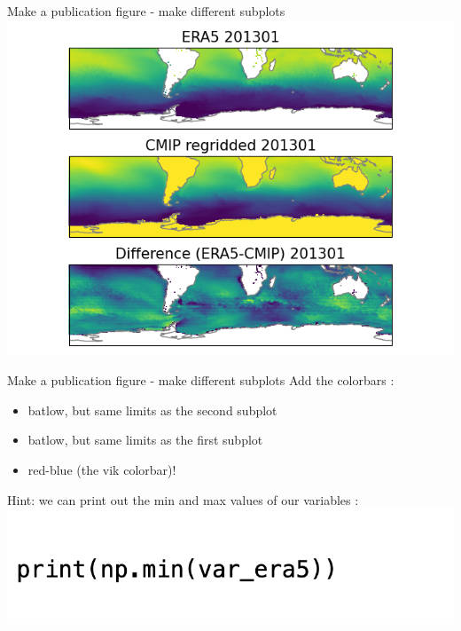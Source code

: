 \begin{frame}{\insertsectionnumber{ |} Make a publication figure - make different subplots} 
    \includegraphics[scale=0.55]{images/script5_fig2.png}
        \vspace{0.3cm}
\end{frame}


\begin{frame}{\insertsectionnumber{ |} Make a publication figure - make different subplots} 
    Add the colorbars : \\
    \begin{itemize}
        \item batlow, but same limits as the second subplot
            \vspace{0.3cm}
        \item batlow, but same limits as the first subplot
            \vspace{0.3cm}
        \item red-blue (the vik colorbar)!
    \end{itemize}
    \vspace{0.3cm}
    Hint: we can print out the min and max values of our variables :
    \includegraphics[scale=0.35]{images/hint.png}\\
\end{frame}

